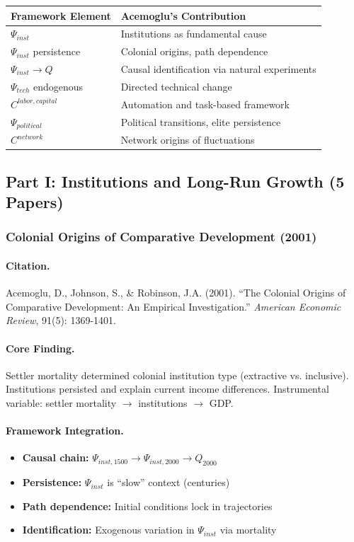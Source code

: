 \documentclass[12pt,a4paper]{article}
\begin{document}
\begin{center}
\renewcommand{\arraystretch}{1.2}
\small
\begin{tabular}{ll}
\hline
\textbf{Framework Element} & \textbf{Acemoglu's Contribution} \\
\hline
$\Psi_{inst}$ & Institutions as fundamental cause \\
$\Psi_{inst}$ persistence & Colonial origins, path dependence \\
$\Psi_{inst} \to Q$ & Causal identification via natural experiments \\
$\Psi_{tech}$ endogenous & Directed technical change \\
$C^{labor,capital}$ & Automation and task-based framework \\
$\Psi_{political}$ & Political transitions, elite persistence \\
$C^{network}$ & Network origins of fluctuations \\
\hline
\end{tabular}
\end{center}

\subsection{Part I: Institutions and Long-Run Growth (5 Papers)}

\subsubsection{Colonial Origins of Comparative Development (2001)}

\paragraph{Citation.}
Acemoglu, D., Johnson, S., \& Robinson, J.A. (2001).
``The Colonial Origins of Comparative Development: An Empirical Investigation.''
\emph{American Economic Review}, 91(5): 1369-1401.

\paragraph{Core Finding.}
Settler mortality determined colonial institution type (extractive vs. inclusive).
Institutions persisted and explain current income differences.
Instrumental variable: settler mortality $\to$ institutions $\to$ GDP.

\paragraph{Framework Integration.}
\begin{itemize}
  \item \textbf{Causal chain:} $\Psi_{inst,1500} \to \Psi_{inst,2000} \to Q_{2000}$
  \item \textbf{Persistence:} $\Psi_{inst}$ is ``slow'' context (centuries)
  \item \textbf{Path dependence:} Initial conditions lock in trajectories
  \item \textbf{Identification:} Exogenous variation in $\Psi_{inst}$ via mortality
\end{itemize}
\end{document}
